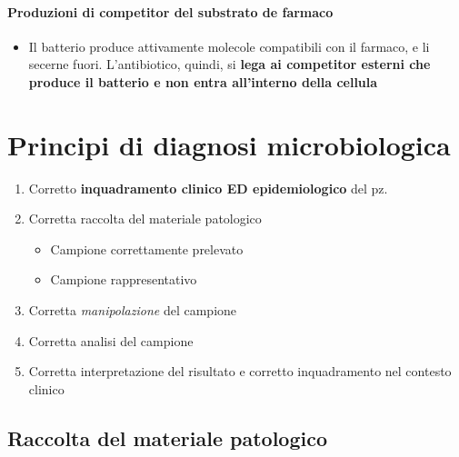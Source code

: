 \documentclass[italian,]{article}
\providecommand{\tightlist}{%
  \setlength{\itemsep}{0pt}\setlength{\parskip}{0pt}}
\begin{document}
\hypertarget{produzioni-di-competitor-del-substrato-de-farmaco}{%
\paragraph{Produzioni di competitor del substrato de
farmaco}\label{produzioni-di-competitor-del-substrato-de-farmaco}}

\begin{itemize}
\tightlist
\item
  Il batterio produce attivamente molecole compatibili con il farmaco, e
  li secerne fuori. L'antibiotico, quindi, si \textbf{lega ai competitor
  esterni che produce il batterio e non entra all'interno della cellula}
\end{itemize}

\hypertarget{principi-di-diagnosi-microbiologica}{%
\section{Principi di diagnosi
microbiologica}\label{principi-di-diagnosi-microbiologica}}

\begin{enumerate}
\def\labelenumi{\arabic{enumi}.}
\tightlist
\item
  Corretto \textbf{inquadramento clinico ED epidemiologico} del pz.
\item
  Corretta raccolta del materiale patologico

  \begin{itemize}
  \tightlist
  \item
    Campione correttamente prelevato
  \item
    Campione rappresentativo
  \end{itemize}
\item
  Corretta \emph{manipolazione} del campione
\item
  Corretta analisi del campione
\item
  Corretta interpretazione del risultato e corretto inquadramento nel
  contesto clinico
\end{enumerate}

\hypertarget{raccolta-del-materiale-patologico}{%
\subsection{Raccolta del materiale
patologico}\label{raccolta-del-materiale-patologico}}
\end{document}
